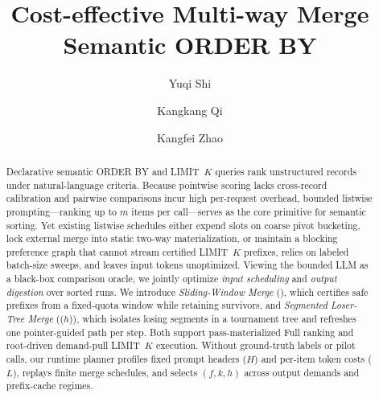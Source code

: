 \documentclass[sigconf, nonacm]{acmart}
\newcommand{\LIMIT}{\textsf{LIMIT}\xspace}
\newcommand{\SW}{\kwnospace{SW}}
\newcommand{\LT}{\kwnospace{LT}}
\begin{document}
\title{Cost-effective Multi-way Merge Semantic ORDER BY}
\author{Yuqi Shi}
\author{Kangkang Qi}
\author{Kangfei Zhao}
\begin{abstract}
Declarative semantic \textsf{ORDER BY} and \LIMIT~$K$ queries rank unstructured records under natural-language criteria. Because pointwise scoring lacks cross-record calibration and pairwise comparisons incur high per-request overhead, bounded listwise prompting—ranking up to $m$ items per call—serves as the core primitive for semantic sorting. Yet existing listwise schedules either expend slots on coarse pivot bucketing, lock external merge into static two-way materialization, or maintain a blocking preference graph that cannot stream certified \LIMIT~$K$ prefixes, relies on labeled batch-size sweeps, and leaves input tokens unoptimized. Viewing the bounded LLM as a black-box comparison oracle, we jointly optimize \emph{input scheduling} and \emph{output digestion} over sorted runs. We introduce \emph{Sliding-Window Merge} (\SW), which certifies safe prefixes from a fixed-quota window while retaining survivors, and \emph{Segmented Loser-Tree Merge} (\LT($h$)), which isolates losing segments in a tournament tree and refreshes one pointer-guided path per step. Both support pass-materialized Full ranking and root-driven demand-pull \LIMIT~$K$ execution. Without ground-truth labels or pilot calls, our runtime planner profiles fixed prompt headers ($H$) and per-item token costs ($L$), replays finite merge schedules, and selects $(f,k,h)$ across output demands and prefix-cache regimes.
\end{abstract}
\maketitle
\vldbtopmatter

\FloatBarrier



\FloatBarrier
\clearpage
\appendix

\clearpage %


\end{document}
